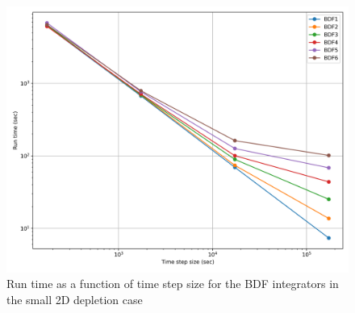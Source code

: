 \clearpage

\begin{figure}[p]
    \centering
    \includegraphics[width=5in]{images/chapter-5/caseStudies/small2DDepletion/msr2DDepletionSmallIntegratorRuntimes.png}
    \caption{Run time as a function of time step size for the BDF integrators in the small 2D depletion case}
    \label{fig:small_2D_depletion_integrator_runtimes}
\end{figure}

\clearpage

